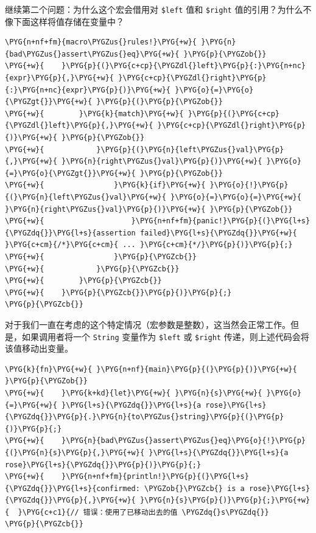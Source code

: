 继续第二个问题：为什么这个宏会借用对 \texttt{\$left} 值和 \texttt{\$right} 值的引用？为什么不像下面这样将值存储在变量中？

\begin{Verbatim}[commandchars=\\\{\},breaklines=true,breakanywhere=true,fontsize=\codefont,xleftmargin=17bp]
\PYG{n+nf+fm}{macro\PYGZus{}rules!}\PYG{+w}{ }\PYG{n}{bad\PYGZus{}assert\PYGZus{}eq}\PYG{+w}{ }\PYG{p}{\PYGZob{}}
\PYG{+w}{    }\PYG{p}{(}\PYG{c+cp}{\PYGZdl{}left}\PYG{p}{:}\PYG{n+nc}{expr}\PYG{p}{,}\PYG{+w}{ }\PYG{c+cp}{\PYGZdl{}right}\PYG{p}{:}\PYG{n+nc}{expr}\PYG{p}{)}\PYG{+w}{ }\PYG{o}{=}\PYG{o}{\PYGZgt{}}\PYG{+w}{ }\PYG{p}{(}\PYG{p}{\PYGZob{}}
\PYG{+w}{        }\PYG{k}{match}\PYG{+w}{ }\PYG{p}{(}\PYG{c+cp}{\PYGZdl{}left}\PYG{p}{,}\PYG{+w}{ }\PYG{c+cp}{\PYGZdl{}right}\PYG{p}{)}\PYG{+w}{ }\PYG{p}{\PYGZob{}}
\PYG{+w}{            }\PYG{p}{(}\PYG{n}{left\PYGZus{}val}\PYG{p}{,}\PYG{+w}{ }\PYG{n}{right\PYGZus{}val}\PYG{p}{)}\PYG{+w}{ }\PYG{o}{=}\PYG{o}{\PYGZgt{}}\PYG{+w}{ }\PYG{p}{\PYGZob{}}
\PYG{+w}{                }\PYG{k}{if}\PYG{+w}{ }\PYG{o}{!}\PYG{p}{(}\PYG{n}{left\PYGZus{}val}\PYG{+w}{ }\PYG{o}{=}\PYG{o}{=}\PYG{+w}{ }\PYG{n}{right\PYGZus{}val}\PYG{p}{)}\PYG{+w}{ }\PYG{p}{\PYGZob{}}
\PYG{+w}{                    }\PYG{n+nf+fm}{panic!}\PYG{p}{(}\PYG{l+s}{\PYGZdq{}}\PYG{l+s}{assertion failed}\PYG{l+s}{\PYGZdq{}}\PYG{+w}{ }\PYG{c+cm}{/*}\PYG{c+cm}{ ... }\PYG{c+cm}{*/}\PYG{p}{)}\PYG{p}{;}
\PYG{+w}{                }\PYG{p}{\PYGZcb{}}
\PYG{+w}{            }\PYG{p}{\PYGZcb{}}
\PYG{+w}{        }\PYG{p}{\PYGZcb{}}
\PYG{+w}{    }\PYG{p}{\PYGZcb{}}\PYG{p}{)}\PYG{p}{;}
\PYG{p}{\PYGZcb{}}
\end{Verbatim}

对于我们一直在考虑的这个特定情况（宏参数是整数），这当然会正常工作。但是，如果调用者将一个 \texttt{String} 变量作为 \texttt{\$left} 或 \texttt{\$right} 传递，则上述代码会将该值移动出变量。

\begin{Verbatim}[commandchars=\\\{\},breaklines=true,breakanywhere=true,fontsize=\codefont,xleftmargin=17bp]
\PYG{k}{fn}\PYG{+w}{ }\PYG{n+nf}{main}\PYG{p}{(}\PYG{p}{)}\PYG{+w}{ }\PYG{p}{\PYGZob{}}
\PYG{+w}{    }\PYG{k+kd}{let}\PYG{+w}{ }\PYG{n}{s}\PYG{+w}{ }\PYG{o}{=}\PYG{+w}{ }\PYG{l+s}{\PYGZdq{}}\PYG{l+s}{a rose}\PYG{l+s}{\PYGZdq{}}\PYG{p}{.}\PYG{n}{to\PYGZus{}string}\PYG{p}{(}\PYG{p}{)}\PYG{p}{;}
\PYG{+w}{    }\PYG{n}{bad\PYGZus{}assert\PYGZus{}eq}\PYG{o}{!}\PYG{p}{(}\PYG{n}{s}\PYG{p}{,}\PYG{+w}{ }\PYG{l+s}{\PYGZdq{}}\PYG{l+s}{a rose}\PYG{l+s}{\PYGZdq{}}\PYG{p}{)}\PYG{p}{;}
\PYG{+w}{    }\PYG{n+nf+fm}{println!}\PYG{p}{(}\PYG{l+s}{\PYGZdq{}}\PYG{l+s}{confirmed: \PYGZob{}\PYGZcb{} is a rose}\PYG{l+s}{\PYGZdq{}}\PYG{p}{,}\PYG{+w}{ }\PYG{n}{s}\PYG{p}{)}\PYG{p}{;}\PYG{+w}{  }\PYG{c+c1}{// 错误：使用了已移动出去的值 \PYGZdq{}s\PYGZdq{}}
\PYG{p}{\PYGZcb{}}
\end{Verbatim}

